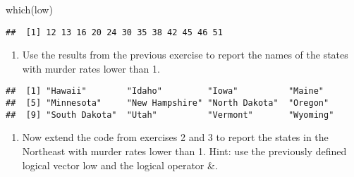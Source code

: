 \documentclass[
]{article}
\newenvironment{Shaded}{\begin{snugshade}}{\end{snugshade}}
\newcommand{\FunctionTok}[1]{\textcolor[rgb]{0.00,0.00,0.00}{#1}}
\newcommand{\NormalTok}[1]{#1}
\newcommand{\OtherTok}[1]{\textcolor[rgb]{0.56,0.35,0.01}{#1}}
\newcommand{\SpecialCharTok}[1]{\textcolor[rgb]{0.00,0.00,0.00}{#1}}
\newcommand{\StringTok}[1]{\textcolor[rgb]{0.31,0.60,0.02}{#1}}
\providecommand{\tightlist}{%
  \setlength{\itemsep}{0pt}\setlength{\parskip}{0pt}}
\begin{document}
\begin{Shaded}
\begin{Highlighting}[]
\FunctionTok{which}\NormalTok{(low)}
\end{Highlighting}
\end{Shaded}

\begin{verbatim}
##  [1] 12 13 16 20 24 30 35 38 42 45 46 51
\end{verbatim}

\begin{enumerate}
\def\labelenumi{\arabic{enumi}.}
\setcounter{enumi}{2}
\tightlist
\item
  Use the results from the previous exercise to report the names of the
  states with murder rates lower than 1.
\end{enumerate}

\begin{Shaded}
\end{Shaded}

\begin{verbatim}
##  [1] "Hawaii"        "Idaho"         "Iowa"          "Maine"        
##  [5] "Minnesota"     "New Hampshire" "North Dakota"  "Oregon"       
##  [9] "South Dakota"  "Utah"          "Vermont"       "Wyoming"
\end{verbatim}

\begin{enumerate}
\def\labelenumi{\arabic{enumi}.}
\setcounter{enumi}{3}
\tightlist
\item
  Now extend the code from exercises 2 and 3 to report the states in the
  Northeast with murder rates lower than 1. Hint: use the previously
  defined logical vector low and the logical operator \&.
\end{enumerate}

\begin{Shaded}
\end{Shaded}
\end{document}
